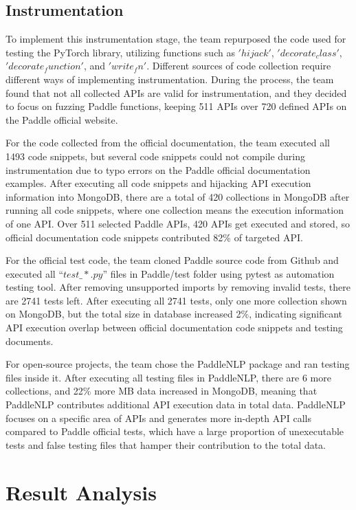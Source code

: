 \documentclass[sigconf]{acmart}
\begin{document}
\subsection{Instrumentation}
To implement this instrumentation stage, the team repurposed the code used for testing the PyTorch library, utilizing functions such as $'hijack'$, $'decorate_class'$, $'decorate_function'$, and $'write_fn'$. 
Different sources of code collection require different ways of implementing instrumentation. During the process, the team found that not all collected APIs are valid for instrumentation, and they decided to focus on fuzzing Paddle functions, 
keeping 511 APIs over 720 defined APIs on the Paddle official website.
\par For the code collected from the official documentation, the team executed all 1493 code snippets, but several code snippets could not compile during instrumentation due to typo errors on the Paddle official documentation examples. 
After executing all code snippets and hijacking API execution information into MongoDB, there are a total of 420 collections in MongoDB after running all code snippets, where one collection means the execution information of one API. 
Over 511 selected Paddle APIs, 420 APIs get executed and stored, so official documentation code snippets contributed 82\% of targeted API.
\par For the official test code, the team cloned Paddle source code from Github and executed all $“test\_*.py”$ files in Paddle/test folder using pytest as automation testing tool. 
After removing unsupported imports by removing invalid tests, there are 2741 tests left. After executing all 2741 tests, only one more collection shown on MongoDB, but the total size in database increased 2\%, 
indicating significant API execution overlap between official documentation code snippets and testing documents.
\par For open-source projects, the team chose the PaddleNLP package and ran testing files inside it. After executing all testing files in PaddleNLP, 
there are 6 more collections, and 22\% more MB data increased in MongoDB, meaning that PaddleNLP contributes additional API execution data in total data. 
PaddleNLP focuses on a specific area of APIs and generates more in-depth API calls compared to Paddle official tests, which have a large proportion of unexecutable tests and false testing files that hamper their contribution to the total data.


\section{Result Analysis}
\end{document}

